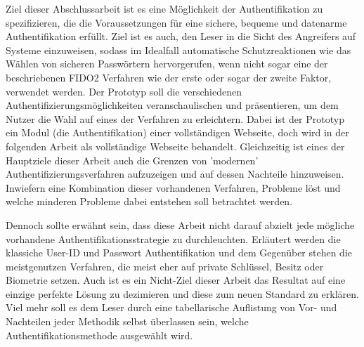 Ziel dieser Abschlussarbeit ist es eine Möglichkeit der Authentifikation zu spezifizieren, die die Voraussetzungen für eine sichere, bequeme und datenarme Authentifikation erfüllt. Ziel ist es auch, den Leser in die Sicht des Angreifers auf Systeme einzuweisen, sodass im Idealfall automatische Schutzreaktionen wie das Wählen von sicheren Passwörtern hervorgerufen, wenn nicht sogar eine der beschriebenen FIDO2 Verfahren wie der erste oder sogar der zweite Faktor, verwendet werden. Der Prototyp soll die verschiedenen Authentifizierungsmöglichkeiten veranschaulischen und präsentieren, um dem Nutzer die Wahl auf eines der Verfahren zu erleichtern. Dabei ist der Prototyp ein Modul (die Authentifikation) einer vollständigen Webseite, doch wird in der folgenden Arbeit als vollständige Webseite behandelt. Gleichzeitig ist eines der Hauptziele dieser Arbeit auch die Grenzen von 'modernen' Authentifizierungsverfahren aufzuzeigen und auf dessen Nachteile hinzuweisen. Inwiefern eine Kombination dieser vorhandenen Verfahren, Probleme löst und welche minderen Probleme dabei entstehen soll betrachtet werden.

Dennoch sollte erwähnt sein, dass diese Arbeit nicht darauf abzielt jede mögliche vorhandene Authentifikationsstrategie zu durchleuchten. Erläutert werden die klassiche User-ID und Passwort Authentifikation und dem Gegenüber stehen die meistgenutzen Verfahren, die meist eher auf private Schlüssel, Besitz oder Biometrie setzen. Auch ist es ein Nicht-Ziel dieser Arbeit das Resultat auf eine einzige perfekte Lösung zu dezimieren und diese zum neuen Standard zu erklären. Viel mehr soll es dem Leser durch eine tabellarische Auflistung von Vor- und Nachteilen jeder Methodik selbst überlassen sein, welche Authentifikationsmethode ausgewählt wird.
